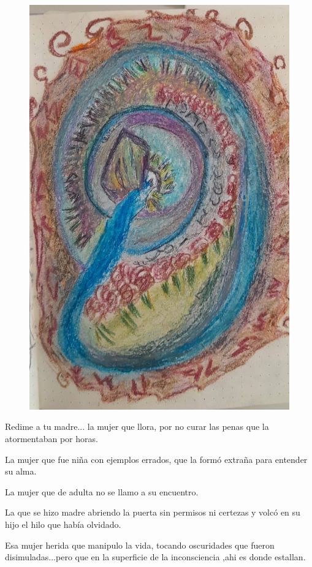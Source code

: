 \documentclass[12pt, a4paper, twoside]{book} %
\begin{document}
\begin{figure}[H]
	\centering
	\includegraphics[width=\textwidth]{./images/1f81324dd8b935.jpg}
\end{figure}

Redime a tu madre...
la mujer que llora, por no curar las penas que la atormentaban  por horas.

La mujer que fue niña con ejemplos errados, que la formó extraña para entender su alma.

La mujer que de adulta no se llamo a su encuentro.

La que se hizo madre abriendo la puerta sin permisos ni certezas y volcó en su hijo el hilo que había olvidado.

Esa mujer herida que manipulo la vida, tocando oscuridades que fueron disimuladas...pero que en la superficie de la inconsciencia ,ahi es donde estallan.
\end{document}
